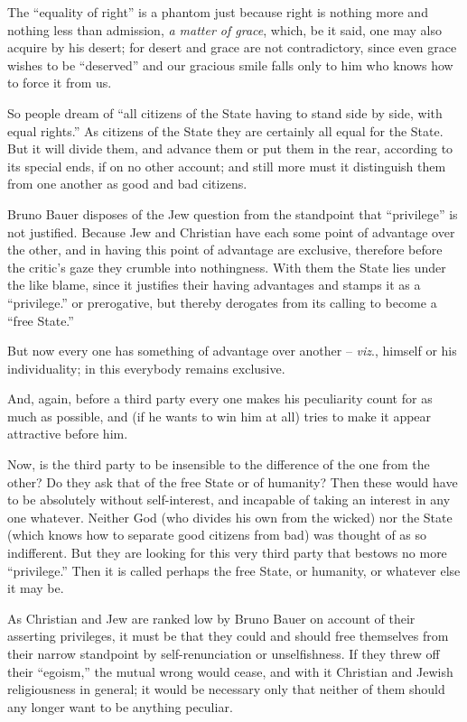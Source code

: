 The ``equality of right'' is a phantom just because right is nothing more 
and nothing less than admission, \textit{a matter of grace}, which, be it 
said, one may also acquire by his desert; for desert and grace are not 
contradictory, since even grace wishes to be ``deserved'' and our gracious 
smile falls only to him who knows how to force it from us.

So people dream of ``all citizens of the State having to stand side by side, 
with equal rights.'' As citizens of the State they are certainly all equal 
for the State. But it will divide them, and advance them or put them in the 
rear, according to its special ends, if on no other account; and still more 
must it distinguish them from one another as good and bad citizens.

Bruno Bauer disposes of the Jew question from the standpoint that 
``privilege'' is not justified. Because Jew and Christian have each some 
point of advantage over the other, and in having this point of advantage are 
exclusive, therefore before the critic's gaze they crumble into nothingness. 
With them the State lies under the like blame, since it justifies their having 
advantages and stamps it as a ``privilege.'' or prerogative, but thereby 
derogates from its calling to become a ``free State.''

But now every one has something of advantage over another -- \textit{viz}., 
himself or his individuality; in this everybody remains exclusive.

And, again, before a third party every one makes his peculiarity count for as 
much as possible, and (if he wants to win him at all) tries to make it appear 
attractive before him.

Now, is the third party to be insensible to the difference of the one from the 
other? Do they ask that of the free State or of humanity? Then these would 
have to be absolutely without self-interest, and incapable of taking an 
interest in any one whatever. Neither God (who divides his own from the 
wicked) nor the State (which knows how to separate good citizens from bad) was 
thought of as so indifferent. But they are looking for this very third party 
that bestows no more ``privilege.'' Then it is called perhaps the free 
State, or humanity, or whatever else it may be.

As Christian and Jew are ranked low by Bruno Bauer on account of their 
asserting privileges, it must be that they could and should free themselves 
from their narrow standpoint by self-renunciation or unselfishness. If they 
threw off their ``egoism,'' the mutual wrong would cease, and with it 
Christian and Jewish religiousness in general; it would be necessary only that 
neither of them should any longer want to be anything peculiar.

